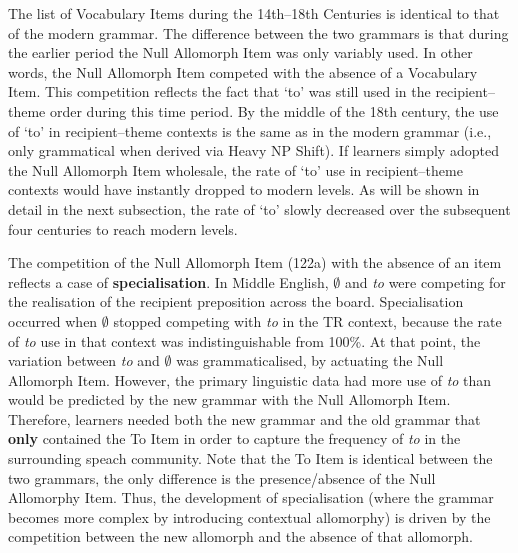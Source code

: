 	The list of Vocabulary Items during the 14th--18th Centuries is identical to that of the modern grammar. The difference between the two grammars is that during the earlier period the Null Allomorph Item was only variably used. In other words, the Null Allomorph Item competed with the absence of a Vocabulary Item. This competition reflects the fact that `to' was still used in the recipient--theme order during this time period. By the middle of the 18th century, the use of `to' in recipient--theme contexts is the same as in the modern grammar (i.e., only grammatical when derived via Heavy NP Shift). If learners simply adopted the Null Allomorph Item wholesale, the rate of `to' use in recipient--theme contexts would have instantly dropped to modern levels. As will be shown in detail in the next subsection, the rate of `to' slowly decreased over the subsequent four centuries to reach modern levels.
	
	The competition of the Null Allomorph Item (122a) with the absence of an item reflects a case of \textbf{specialisation}. In Middle English, $\emptyset$ and \textit{to} were competing for the realisation of the recipient preposition across the board. Specialisation occurred when $\emptyset$ stopped competing with \textit{to} in the TR context, because the rate of \textit{to} use in that context was indistinguishable from 100\%. At that point, the variation between \textit{to} and $\emptyset$ was grammaticalised, by actuating the Null Allomorph Item. However, the primary linguistic data had more use of \textit{to} than would be predicted by the new grammar with the Null Allomorph Item. Therefore, learners needed both the new grammar and the old grammar that \textbf{only} contained the To Item in order to capture the frequency of \textit{to} in the surrounding speach community. Note that the To Item is identical between the two grammars, the only difference is the presence/absence of the Null Allomorphy Item. Thus, the development of specialisation (where the grammar becomes more complex by introducing contextual allomorphy) is driven by the competition between the new allomorph and the absence of that allomorph.

